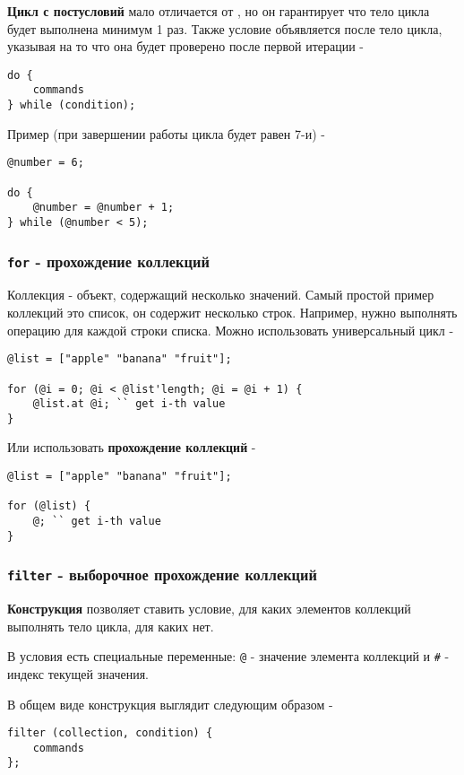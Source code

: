 \documentclass[a4paper, 14pt]{extarticle}
\begin{document}
{\bf Цикл с постусловий} мало отличается от , но он гарантирует что тело цикла будет выполнена минимум 1 раз. Также условие объявляется после тело цикла, указывая на то что она будет проверено после первой итерации -
\begin{lstlisting}[numbers=none]
do {
	commands
} while (condition);
\end{lstlisting}

\noindent Пример (при завершении работы цикла  будет равен 7-и) -
\begin{lstlisting}[numbers=none]
@number = 6;

do {
	@number = @number + 1;
} while (@number < 5);
\end{lstlisting}

\subsubsection{\lstinline`for` - прохождение коллекций}

{Коллекция} - объект, содержащий несколько значений. Самый простой пример коллекций это список, он содержит несколько строк. Например, нужно выполнять операцию для каждой строки списка. Можно использовать универсальный цикл -
\begin{lstlisting}
@list = ["apple" "banana" "fruit"];

for (@i = 0; @i < @list'length; @i = @i + 1) {
	@list.at @i; `` get i-th value
}
\end{lstlisting}

Или использовать {\bf прохождение коллекций} -
\begin{lstlisting}
@list = ["apple" "banana" "fruit"];

for (@list) {
	@; `` get i-th value
}
\end{lstlisting}

\subsubsection{\lstinline`filter` - выборочное прохождение коллекций}

{\bf Конструкция } позволяет ставить условие, для каких элементов коллекций выполнять тело цикла, для каких нет.

В условия есть специальные переменные: \lstinline|@| - значение элемента коллекций и \lstinline|#| - индекс текущей значения.

В общем виде конструкция выглядит следующим образом -
\begin{lstlisting}[numbers=none]
filter (collection, condition) {
	commands
};
\end{lstlisting}
\end{document}
